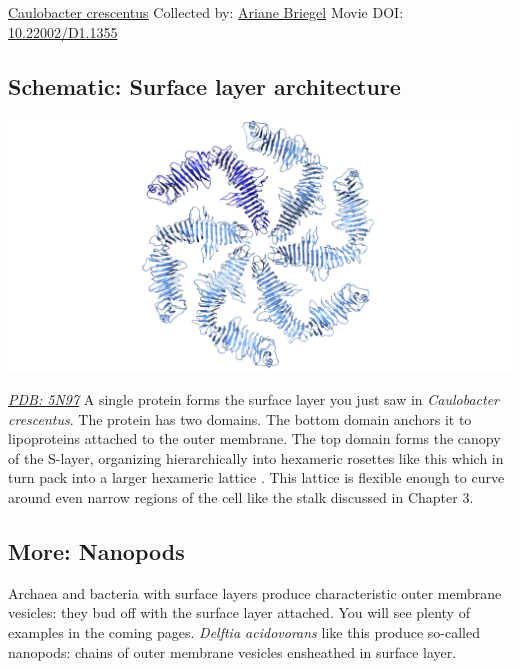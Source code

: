 \documentclass[]{tufte-book}
\begin{document}
\hypertarget{htmlwidget-ebce5e1ac57d287a8ab2}{}

\label{fig:2-6}\protect\hyperlink{tree}{Caulobacter crescentus} Collected by: \protect\hyperlink{ariane_briegel}{Ariane Briegel} Movie DOI: \href{https://doi.org/10.22002/D1.1355}{10.22002/D1.1355}

\hypertarget{Surface_layer_architecture}{%
\subsection*{Schematic: Surface layer architecture}\label{Surface_layer_architecture}}

\includegraphics{img/schematics/2_6_1}

\href{http://rcsb.org/structure/5N97}{\emph{PDB: 5N97}}
A single protein forms the surface layer you just saw in \emph{Caulobacter crescentus}. The protein has two domains. The bottom domain anchors it to lipoproteins attached to the outer membrane. The top domain forms the canopy of the S-layer, organizing hierarchically into hexameric rosettes like this which in turn pack into a larger hexameric lattice \citep{bharat2017}. This lattice is flexible enough to curve around even narrow regions of the cell like the stalk discussed in Chapter 3.

\hypertarget{Nanopods}{%
\subsection*{More: Nanopods}\label{Nanopods}}

Archaea and bacteria with surface layers produce characteristic outer membrane vesicles: they bud off with the surface layer attached. You will see plenty of examples in the coming pages. \emph{Delftia acidovorans} like this produce so-called nanopods: chains of outer membrane vesicles ensheathed in surface layer.
\end{document}
